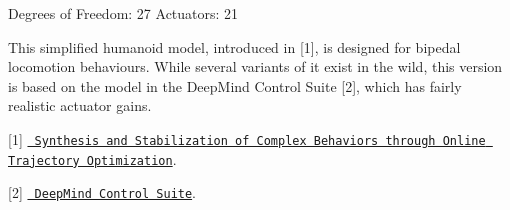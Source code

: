 Degrees of Freedom\+: 27 Actuators\+: 21

This simplified humanoid model, introduced in \mbox{[}1\mbox{]}, is designed for bipedal locomotion behaviours. While several variants of it exist in the wild, this version is based on the model in the Deep\+Mind Control Suite \mbox{[}2\mbox{]}, which has fairly realistic actuator gains.

\mbox{[}1\mbox{]} \href{https://doi.org/10.1109/IROS.2012.6386025}{\texttt{ Synthesis and Stabilization of Complex Behaviors through Online Trajectory Optimization}}.

\mbox{[}2\mbox{]} \href{https://arxiv.org/abs/1801.00690}{\texttt{ Deep\+Mind Control Suite}}.

 